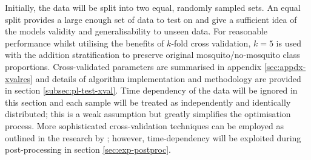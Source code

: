         Initially, the data will be split into two equal, randomly sampled sets. An equal split provides a large enough set of data to test on and give a sufficient idea of the models validity and generalisability to unseen data. For reasonable performance whilst utilising the benefits of $k$-fold cross validation, $k=5$ is used with the addition stratification to preserve original mosquito/no-mosquito class proportions. Cross-validated parameters are summarised in appendix \ref{sec:appdx-xvalres} and details of algorithm implementation and methodology are provided in section \ref{subsec:pl-test-xval}. Time dependency of the data will be ignored in this section and each sample will be treated as independently and identically distributed; this is a weak assumption but greatly simplifies the optimisation process. More sophisticated cross-validation techniques can be employed as outlined in the research by \textcite{Yang2001}; however, time-dependency will be exploited during post-processing in section \ref{sec:exp-postproc}.

        
        
    
        
     
         
  
    
        
